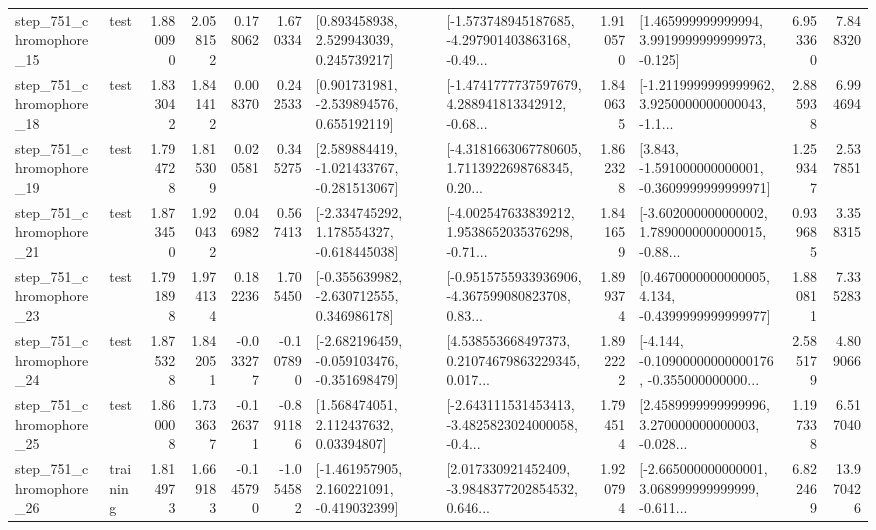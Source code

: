 \begin{tabular}{llrrrrllrlrr}
  step\_751\_chromophore\_15 &      test &      1.880090 &    2.058152 &      0.178062 &  1.670334 &     [0.893458938, 2.529943039, 0.245739217] &  [-1.573748945187685, -4.297901403863168, -0.49... &       1.910570 &    [1.465999999999994, 3.9919999999999973, -0.125] &            6.953360 &          7.848320 \\
  step\_751\_chromophore\_18 &      test &      1.833042 &    1.841412 &      0.008370 &  0.242533 &    [0.901731981, -2.539894576, 0.655192119] &  [-1.4741777737597679, 4.288941813342912, -0.68... &       1.840635 &  [-1.2119999999999962, 3.9250000000000043, -1.1... &            2.885938 &          6.994694 \\
  step\_751\_chromophore\_19 &      test &      1.794728 &    1.815309 &      0.020581 &  0.345275 &   [2.589884419, -1.021433767, -0.281513067] &  [-4.3181663067780605, 1.7113922698768345, 0.20... &       1.862328 &   [3.843, -1.591000000000001, -0.3609999999999971] &            1.259347 &          2.537851 \\
  step\_751\_chromophore\_21 &      test &      1.873450 &    1.920432 &      0.046982 &  0.567413 &   [-2.334745292, 1.178554327, -0.618445038] &  [-4.002547633839212, 1.9538652035376298, -0.71... &       1.841659 &  [-3.602000000000002, 1.7890000000000015, -0.88... &            0.939685 &          3.358315 \\
  step\_751\_chromophore\_23 &      test &      1.791898 &    1.974134 &      0.182236 &  1.705450 &   [-0.355639982, -2.630712555, 0.346986178] &  [-0.9515755933936906, -4.367599080823708, 0.83... &       1.899374 &   [0.4670000000000005, 4.134, -0.4399999999999977] &            1.880811 &          7.335283 \\
  step\_751\_chromophore\_24 &      test &      1.875328 &    1.842051 &     -0.033277 & -0.107890 &  [-2.682196459, -0.059103476, -0.351698479] &  [4.538553668497373, 0.21074679863229345, 0.017... &       1.892222 &  [-4.144, -0.10900000000000176, -0.355000000000... &            2.585179 &          4.809066 \\
  step\_751\_chromophore\_25 &      test &      1.860008 &    1.733637 &     -0.126371 & -0.891186 &      [1.568474051, 2.112437632, 0.03394807] &  [-2.643111531453413, -3.4825823024000058, -0.4... &       1.794514 &  [2.4589999999999996, 3.270000000000003, -0.028... &            1.197338 &          6.517040 \\
  step\_751\_chromophore\_26 &  training &      1.814973 &    1.669183 &     -0.145790 & -1.054582 &   [-1.461957905, 2.160221091, -0.419032399] &  [2.017330921452409, -3.9848377202854532, 0.646... &       1.920794 &  [-2.665000000000001, 3.068999999999999, -0.611... &            6.822469 &         13.970426 \\

\end{tabular}
